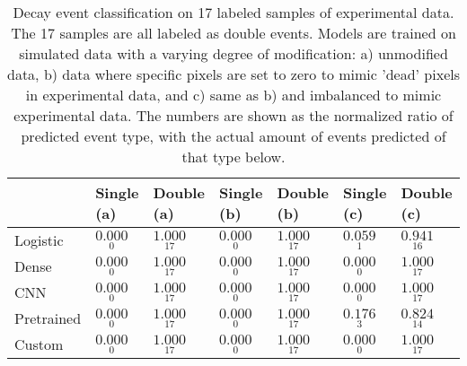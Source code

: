 \begin{table}
\centering
\caption{
Decay event classification on 17 labeled samples of experimental data. The 17 samples are all
labeled as double events. Models are trained on simulated data with a varying degree of modification:
a) unmodified data, b) data where specific pixels are set to zero to mimic
'dead' pixels in experimental data, and c) same as b) and imbalanced to mimic experimental data.
The numbers are shown as the normalized ratio of predicted event type, with the actual amount of
events predicted of that type below.
}
\label{tab:classification-experimental-labeled-doubles}
\begin{tabular}{lllllll}
\toprule
{} &                                Single (a) &                                 Double (a) &                                Single (b) &                                 Double (b) &                                Single (c) &                                 Double (c) \\
\midrule
Logistic   &  $\underset{\num{ 0 }  }{\num{ 0.000 } }$ &  $\underset{\num{ 17 }  }{\num{ 1.000 } }$ &  $\underset{\num{ 0 }  }{\num{ 0.000 } }$ &  $\underset{\num{ 17 }  }{\num{ 1.000 } }$ &  $\underset{\num{ 1 }  }{\num{ 0.059 } }$ &  $\underset{\num{ 16 }  }{\num{ 0.941 } }$ \\
Dense      &  $\underset{\num{ 0 }  }{\num{ 0.000 } }$ &  $\underset{\num{ 17 }  }{\num{ 1.000 } }$ &  $\underset{\num{ 0 }  }{\num{ 0.000 } }$ &  $\underset{\num{ 17 }  }{\num{ 1.000 } }$ &  $\underset{\num{ 0 }  }{\num{ 0.000 } }$ &  $\underset{\num{ 17 }  }{\num{ 1.000 } }$ \\
CNN        &  $\underset{\num{ 0 }  }{\num{ 0.000 } }$ &  $\underset{\num{ 17 }  }{\num{ 1.000 } }$ &  $\underset{\num{ 0 }  }{\num{ 0.000 } }$ &  $\underset{\num{ 17 }  }{\num{ 1.000 } }$ &  $\underset{\num{ 0 }  }{\num{ 0.000 } }$ &  $\underset{\num{ 17 }  }{\num{ 1.000 } }$ \\
Pretrained &  $\underset{\num{ 0 }  }{\num{ 0.000 } }$ &  $\underset{\num{ 17 }  }{\num{ 1.000 } }$ &  $\underset{\num{ 0 }  }{\num{ 0.000 } }$ &  $\underset{\num{ 17 }  }{\num{ 1.000 } }$ &  $\underset{\num{ 3 }  }{\num{ 0.176 } }$ &  $\underset{\num{ 14 }  }{\num{ 0.824 } }$ \\
Custom     &  $\underset{\num{ 0 }  }{\num{ 0.000 } }$ &  $\underset{\num{ 17 }  }{\num{ 1.000 } }$ &  $\underset{\num{ 0 }  }{\num{ 0.000 } }$ &  $\underset{\num{ 17 }  }{\num{ 1.000 } }$ &  $\underset{\num{ 0 }  }{\num{ 0.000 } }$ &  $\underset{\num{ 17 }  }{\num{ 1.000 } }$ \\
\bottomrule
\end{tabular}
\end{table}
